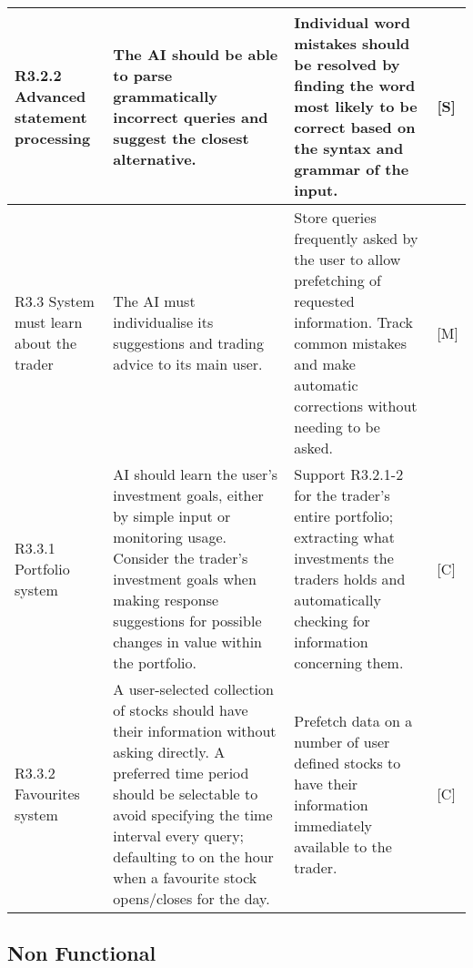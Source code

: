 \documentclass[9pt]{article} %
\begin{document}
\begin{center}
\begin{longtable}{ | m{3cm} | m{7cm} | m{7cm} | m{0.5cm} | }
		\hline
		
		R3.2.2 Advanced statement processing & 
		The AI should be able to parse grammatically incorrect queries and suggest the closest alternative. & 
		Individual word mistakes should be resolved by finding the word most likely to be correct based on the syntax and grammar of the input. & 
		[S] \\
		
		\hline
		
		R3.3 System must learn about the trader & 
		The AI must individualise its suggestions and trading advice to its main user. & 
		Store queries frequently asked by the user to allow prefetching of requested information. Track common mistakes and make automatic corrections without needing to be asked. & 
		[M] \\
		
		\hline
		
		R3.3.1 Portfolio system & 
		AI should learn the user’s investment goals, either by simple input or monitoring usage. Consider the trader’s investment goals when making response suggestions for possible changes in value within the portfolio. & 
		Support R3.2.1-2 for the trader’s entire portfolio; extracting what investments the traders holds and automatically checking for information concerning them. & 
		[C] \\
		
		\hline
		
		R3.3.2 Favourites system & 
		A user-selected collection of stocks should have their information without asking directly. A preferred time period should be selectable to avoid specifying the time interval every query; defaulting to on the hour when a favourite stock opens/closes for the day. & 
		Prefetch data on a number of user defined stocks to have their information immediately available to the trader. &
		[C] \\
		
		\hline
	
	\end{longtable}
	\end{center}
	
	\subsection{Non Functional}
	
\end{document}
